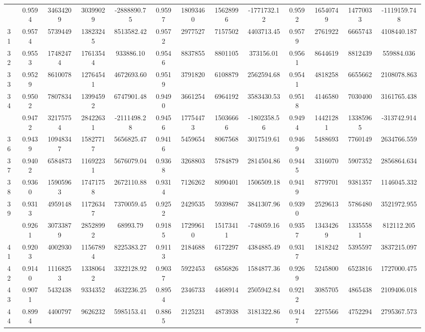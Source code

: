 \documentclass[
  12pt,
]{article}
\begin{document}
\begin{longtable}[t]{lcccccccccccc}
\addlinespace
30 & 0.9594 & 34634209 & 30399029 & -2888890.75 & 0.9597 & 18093460 & 15628996 & -1771732.12 & 0.9592 & 16540749 & 14770033 & -1119159.748\\
31 & 0.9574 & 5739449 & 13823245 & 8513582.42 & 0.9572 & 2977527 & 7157502 & 4403713.45 & 0.9579 & 2761922 & 6665743 & 4108440.187\\
32 & 0.9553 & 17482474 & 17613544 & 933886.10 & 0.9546 & 8837855 & 8801105 & 373156.01 & 0.9561 & 8644619 & 8812439 & 559884.036\\
33 & 0.9529 & 8610078 & 12764541 & 4672693.60 & 0.9519 & 3791820 & 6108879 & 2562594.68 & 0.9541 & 4818258 & 6655662 & 2108078.863\\
34 & 0.9502 & 7807834 & 13994592 & 6747901.48 & 0.9490 & 3661254 & 6964192 & 3583430.53 & 0.9518 & 4146580 & 7030400 & 3161765.438\\
\addlinespace
35 & 0.9472 & 32175754 & 28422631 & -2111498.28 & 0.9456 & 17754473 & 15036666 & -1802358.56 & 0.9494 & 14421281 & 13385965 & -313742.914\\
36 & 0.9439 & 10948347 & 15827717 & 5656825.47 & 0.9416 & 5459654 & 8067568 & 3017519.61 & 0.9469 & 5488693 & 7760149 & 2634766.559\\
37 & 0.9402 & 6584873 & 11692231 & 5676079.04 & 0.9368 & 3268803 & 5784879 & 2814504.86 & 0.9445 & 3316070 & 5907352 & 2856864.634\\
38 & 0.9360 & 15905963 & 17471758 & 2672110.88 & 0.9314 & 7126262 & 8090401 & 1506509.18 & 0.9419 & 8779701 & 9381357 & 1146045.332\\
39 & 0.9313 & 4959148 & 11726347 & 7370059.45 & 0.9252 & 2429535 & 5939867 & 3841307.96 & 0.9390 & 2529613 & 5786480 & 3521972.955\\
\addlinespace
40 & 0.9261 & 30733879 & 28528992 & 68993.79 & 0.9185 & 17299610 & 15173411 & -748059.16 & 0.9357 & 13434269 & 13355581 & 812112.205\\
41 & 0.9203 & 4002930 & 11567894 & 8225383.27 & 0.9113 & 2184688 & 6172297 & 4384885.49 & 0.9317 & 1818242 & 5395597 & 3837215.097\\
42 & 0.9140 & 11168253 & 13380642 & 3322128.92 & 0.9037 & 5922453 & 6856826 & 1584877.36 & 0.9269 & 5245800 & 6523816 & 1727000.475\\
43 & 0.9071 & 5432438 & 9334352 & 4632236.25 & 0.8954 & 2346733 & 4468914 & 2505942.84 & 0.9212 & 3085705 & 4865438 & 2109406.018\\
44 & 0.8994 & 4400797 & 9626232 & 5985153.41 & 0.8865 & 2125231 & 4873938 & 3181322.86 & 0.9147 & 2275566 & 4752294 & 2795367.573\\

\end{longtable}
\end{document}
